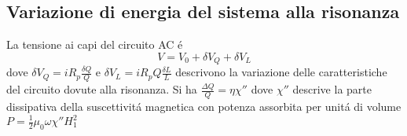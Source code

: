 \documentclass[main.tex]{subfiles}
\begin{document}
\subsection{Variazione di energia del sistema alla risonanza}

La tensione ai capi del circuito AC \'e
\begin{equation*}
V=V_0+\delta V_Q+\delta V_L
\end{equation*}
dove $\delta V_Q=iR_p\frac{\delta Q}{Q}$ e $\delta V_L=iR_pQ\frac{\delta L}{L}$ descrivono la variazione delle caratteristiche del circuito dovute alla risonanza.
Si ha $\frac{\Delta Q}{Q}=\eta\chi''$ dove $\chi''$ descrive la parte dissipativa della suscettivit\'a magnetica con potenza assorbita per unit\'a di volume $P=\frac{1}{2}\mu_0\omega\chi''H_1^2$

\end{document}
